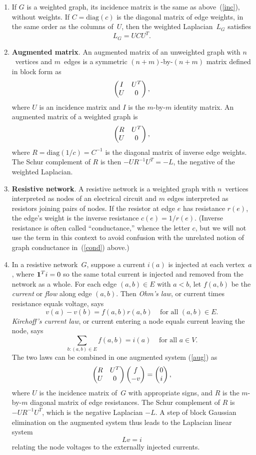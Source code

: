 \documentclass[11pt]{article}
\newcommand{\m}[1]{{\bf{#1}}}       %
\newcommand{\ones}{\m1}             %
\newcommand{\diag}{\mbox{diag}}
\begin{document}
\begin{enumerate}
\item
If $G$ is a weighted graph, its incidence matrix is the same
as above~(\ref{inc}), without weights.  If $C=\diag(c)$ is
the diagonal matrix of edge weights, in the same order as the
columns of~$U$, then the weighted Laplacian~$L_G$ satisfies
$$L_G = UCU^T.$$

\item\label{aug}{\bf Augmented matrix}.
An augmented matrix of an unweighted graph with $n$~vertices 
and $m$~edges is a
symmetric $(n+m)$-by-$(n+m)$ matrix defined in block form as
$$
\begin{pmatrix}
I & U^T \cr
U & 0 \cr
\end{pmatrix}
,
$$
where $U$ is an incidence matrix and $I$ is the $m$-by-$m$ 
identity matrix.
An augmented matrix of a weighted graph is
$$
\begin{pmatrix}
R & U^T \cr
U & 0 \cr
\end{pmatrix}
,
$$
where $R=\diag(1/c)=C^{-1}$ is the diagonal matrix of inverse edge weights.
The Schur complement of $R$ is then $-UR^{-1}U^T = -L$, the negative
of the weighted Laplacian.

\item\label{resistive}{\bf Resistive network}.
A resistive network is a weighted graph with $n$~vertices
interpreted as nodes of an electrical circuit and $m$ edges interpreted
as resistors joining pairs of nodes.  
If the resistor at edge $e$ has resistance $r(e)$, the edge's weight
is the inverse resistance $c(e) = 1/r(e)$.
(Inverse resistance is often called ``conductance,'' whence the letter $c$, 
but we will not use the term in this context to avoid confusion with the
unrelated notion of graph conductance in~(\ref{cond}) above.)

\item
In a resistive network~$G$, suppose a current $i(a)$ is injected at each
vertex~$a$, where $\ones^T i=0$ so the same total current is injected and
removed from the network as a whole.
For each edge $(a,b)\in E$ with $a<b$, let $f(a,b)$ be the {\em current} or 
{\em flow} along edge $(a,b)$.
Then {\em Ohm's law}, or current times resistance equals voltage, says
$$v(a)-v(b) = f(a,b)r(a,b) \;\;\;\; \mbox{for all $(a,b)\in E$}.$$
{\em Kirchoff's current law}, or current entering a node equals current leaving the node,
says
$$\sum_{b:(a,b)\in E} f(a,b) = i(a) \;\;\;\; \mbox{for all $a\in V$}.$$
The two laws can be combined in one augmented system (\ref{aug}) as
$$
\begin{pmatrix}
R & U^T \cr
U & 0 \cr
\end{pmatrix}
\begin{pmatrix}
f \cr
-v \cr
\end{pmatrix}
=
\begin{pmatrix}
0 \cr
i \cr
\end{pmatrix},
$$
where $U$ is the incidence matrix of~$G$
with appropriate signs, and $R$ is the
$m$-by-$m$ diagonal matrix of edge resistances.
The Schur complement of $R$ is $-UR^{-1}U^T$, 
which is the negative Laplacian $-L$.  
A step of block Gaussian elimination on the augmented
system thus leads to the Laplacian linear system
$$Lv=i$$
relating the node voltages to the externally injected currents.


\end{enumerate}
\end{document}
